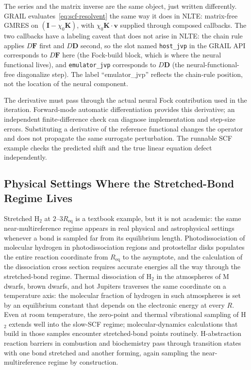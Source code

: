 \documentclass[11pt]{article}
\newcommand{\code}[1]{\texttt{#1}}
\begin{document}
The series and the matrix inverse are the same object, just written
differently.  GRAIL evaluates~\eqref{eq:scf-resolvent} the same way
it does in NLTE: matrix-free GMRES on $(\mathbf{I} -
\chi_0\mathbf{K})$, with $\chi_0\mathbf{K} \cdot \mathbf{v}$ supplied
through composed callbacks.  The two callbacks have a labeling
caveat that does not arise in NLTE: the chain rule applies
$D\mathbf{F}$ first and $D\mathbf{D}$ second, so the slot named
\code{host\_jvp} in the GRAIL API corresponds to $D\mathbf{F}$ here
(the Fock-build block, which is where the neural functional lives),
and \code{emulator\_jvp} corresponds to $D\mathbf{D}$ (the
neural-functional-free diagonalize step).  The label
``emulator\_jvp'' reflects the chain-rule position, not the location
of the neural component.

The derivative must pass through the actual neural Fock contribution
used in the iteration. Forward-mode automatic differentiation provides
this derivative; an independent finite-difference check can diagnose
implementation and step-size errors. Substituting a derivative of the
reference functional changes the operator and does not propagate the
same surrogate perturbation. The runnable SCF example checks the
predicted shift and the true linear equation defect independently.


\subsection{Physical Settings Where the Stretched-Bond Regime Lives}
\label{sec:scf-physical-settings}

Stretched H$_2$ at $2$--$3 R_{\text{eq}}$ is a textbook example, but
it is not academic: the same near-multireference regime appears in
real physical and astrophysical settings whenever a bond is sampled
far from its equilibrium length.  Photodissociation of molecular
hydrogen in photodissociation regions and protostellar disks
populates the entire reaction coordinate from $R_{\text{eq}}$ to the
asymptote, and the calculation of the dissociation cross section
requires accurate energies all the way through the stretched-bond
regime.  Thermal dissociation of H$_2$ in the atmospheres of M
dwarfs, brown dwarfs, and hot Jupiters traverses the same coordinate
on a temperature axis: the molecular fraction of hydrogen in such
atmospheres is set by an equilibrium constant that depends on the
electronic energy at every $R$.  Even at room temperature, the
zero-point and thermal vibrational sampling of H$_2$ extends well
into the slow-SCF regime; molecular-dynamics calculations that build
in those samples encounter stretched-bond points routinely.
H-abstraction reaction barriers in combustion and biochemistry pass
through transition states with one bond stretched and another
forming, again sampling the near-multireference regime by
construction.
\end{document}
